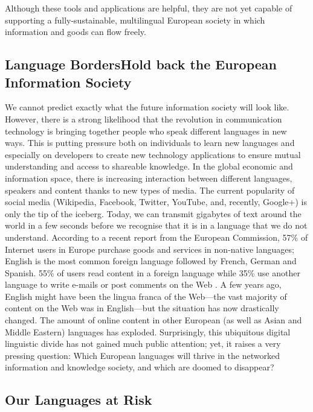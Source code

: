 \begin{multicols}{2}
Although these tools and applications are helpful, they are not yet capable of supporting a fully-sustainable, multilingual European society in which information and goods can flow freely.

\subsection[Language Borders Hold back the European Information Society]{Language Borders\newline Hold back the European Information Society}

We cannot predict exactly what the future information society will look like. 
However, there is a strong likelihood that the revolution in communication technology is bringing together people who speak different languages in new ways. This is putting pressure both on individuals to learn new languages and especially on developers to create new technology applications to ensure mutual understanding and access to shareable knowledge. In the global economic and information space, there is increasing interaction between different languages, speakers and content thanks to new types of media. The current popularity of social media (Wikipedia, Facebook, Twitter, YouTube, and, recently, Google+) is only the tip of the iceberg.
Today, we can transmit gigabytes of text around the world in a few seconds before we recognise that it is in a language that we do not understand. According to a recent report from the European Commission, 57\% of Internet users in Europe purchase goods and services in non-native languages; English is the most common foreign language followed by French, German and Spanish. 55\% of users read content in a foreign language while 35\% use another language to write e-mails or post comments on the Web \cite{EC1}. A few years ago, English might have been the lingua franca of the Web—the vast majority of content on the Web was in English—but the situation has now drastically changed. The amount of online content in other European (as well as Asian and Middle Eastern) languages has ex\-plo\-ded.
Surprisingly, this ubiquitous digital linguistic divide has not gained much public attention; yet, it raises a very pressing question: Which European languages will thrive in the networked information and knowledge society, and which are doomed to disappear?

\subsection{Our Languages at Risk}


\end{multicols}
